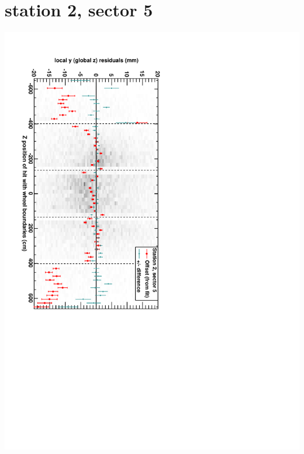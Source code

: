 \documentclass[compress]{beamer}
\begin{document}
\section*{station 2, sector 5}
\begin{frame} \vfill \mbox{\hspace{-1 cm}\includegraphics[height=1.2\linewidth, angle=90]{DTzVsZ_st2_sr05.pdf}} \end{frame}
\end{document}
